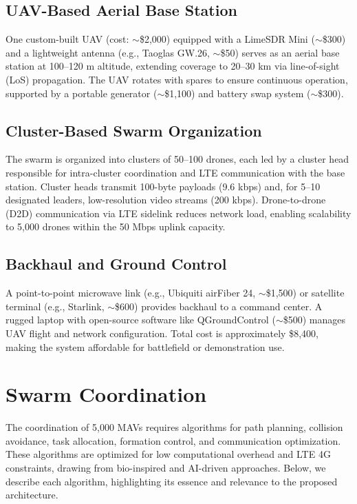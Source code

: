 \documentclass{article}
\begin{document}
\subsection{UAV-Based Aerial Base Station}
One custom-built UAV (cost: $\sim$\$2,000) equipped with a LimeSDR Mini ($\sim$\$300) and a lightweight antenna (e.g., Taoglas GW.26, $\sim$\$50) serves as an aerial base station at 100--120 m altitude, extending coverage to 20--30 km via line-of-sight (LoS) propagation. The UAV rotates with spares to ensure continuous operation, supported by a portable generator ($\sim$\$1,100) and battery swap system ($\sim$\$300).

\subsection{Cluster-Based Swarm Organization}
The swarm is organized into clusters of 50--100 drones, each led by a cluster head responsible for intra-cluster coordination and LTE communication with the base station. Cluster heads transmit 100-byte payloads (9.6 kbps) and, for 5--10 designated leaders, low-resolution video streams (200 kbps). Drone-to-drone (D2D) communication via LTE sidelink reduces network load, enabling scalability to 5,000 drones within the 50 Mbps uplink capacity.

\subsection{Backhaul and Ground Control}
A point-to-point microwave link (e.g., Ubiquiti airFiber 24, $\sim$\$1,500) or satellite terminal (e.g., Starlink, $\sim$\$600) provides backhaul to a command center. A rugged laptop with open-source software like QGroundControl ($\sim$\$500) manages UAV flight and network configuration. Total cost is approximately \$8,400, making the system affordable for battlefield or demonstration use.

\section{Swarm Coordination}
The coordination of 5,000 MAVs requires algorithms for path planning, collision avoidance, task allocation, formation control, and communication optimization. These algorithms are optimized for low computational overhead and LTE 4G constraints, drawing from bio-inspired and AI-driven approaches. Below, we describe each algorithm, highlighting its essence and relevance to the proposed architecture.
\end{document}
